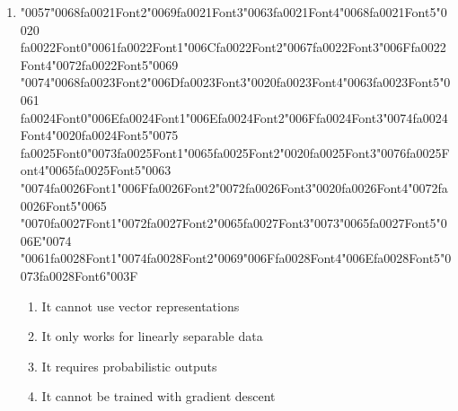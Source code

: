 \documentclass[12pt]{article}
\begin{document}
\begin{enumerate}[label=Q\arabic*.]
\begin{enumerate}[label=(\Alph*)]
    \item Laplace smoothing
    \item Regularization
    \item TF-IDF
    \item Softmax normalization
\end{enumerate}
\item {\char"0057}{\char"0068}{\csname fa0021Font2\endcsname\char"0069}{\csname fa0021Font3\endcsname\char"0063}{\csname fa0021Font4\endcsname\char"0068}{\csname fa0021Font5\endcsname\char"0020} {\csname fa0022Font0\endcsname\char"0061}{\csname fa0022Font1\endcsname\char"006C}{\csname fa0022Font2\endcsname\char"0067}{\csname fa0022Font3\endcsname\char"006F}{\csname fa0022Font4\endcsname\char"0072}{\csname fa0022Font5\endcsname\char"0069} {\char"0074}{\char"0068}{\csname fa0023Font2\endcsname\char"006D}{\csname fa0023Font3\endcsname\char"0020}{\csname fa0023Font4\endcsname\char"0063}{\csname fa0023Font5\endcsname\char"0061} {\csname fa0024Font0\endcsname\char"006E}{\csname fa0024Font1\endcsname\char"006E}{\csname fa0024Font2\endcsname\char"006F}{\csname fa0024Font3\endcsname\char"0074}{\csname fa0024Font4\endcsname\char"0020}{\csname fa0024Font5\endcsname\char"0075} {\csname fa0025Font0\endcsname\char"0073}{\csname fa0025Font1\endcsname\char"0065}{\csname fa0025Font2\endcsname\char"0020}{\csname fa0025Font3\endcsname\char"0076}{\csname fa0025Font4\endcsname\char"0065}{\csname fa0025Font5\endcsname\char"0063} {\char"0074}{\csname fa0026Font1\endcsname\char"006F}{\csname fa0026Font2\endcsname\char"0072}{\csname fa0026Font3\endcsname\char"0020}{\csname fa0026Font4\endcsname\char"0072}{\csname fa0026Font5\endcsname\char"0065} {\char"0070}{\csname fa0027Font1\endcsname\char"0072}{\csname fa0027Font2\endcsname\char"0065}{\csname fa0027Font3\endcsname\char"0073}{\char"0065}{\csname fa0027Font5\endcsname\char"006E}{\char"0074} {\char"0061}{\csname fa0028Font1\endcsname\char"0074}{\csname fa0028Font2\endcsname\char"0069}{\char"006F}{\csname fa0028Font4\endcsname\char"006E}{\csname fa0028Font5\endcsname\char"0073}{\csname fa0028Font6\endcsname\char"003F}
\begin{enumerate}[label=(\Alph*)]
    \item It cannot use vector representations
    \item It only works for linearly separable data
    \item It requires probabilistic outputs
    \item It cannot be trained with gradient descent

\end{enumerate}
\end{enumerate}
\end{document}
